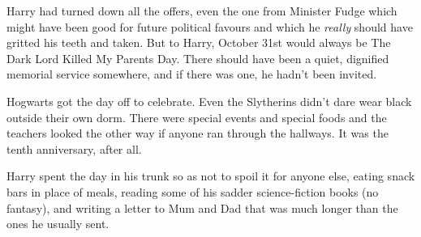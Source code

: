 Harry had turned down all the offers, even the one from Minister Fudge which might have been good for future political favours and which he \emph{really} should have gritted his teeth and taken. But to Harry, October 31st would always be The Dark Lord Killed My Parents Day. There should have been a quiet, dignified memorial service somewhere, and if there was one, he hadn’t been invited.

Hogwarts got the day off to celebrate. Even the Slytherins didn’t dare wear black outside their own dorm. There were special events and special foods and the teachers looked the other way if anyone ran through the hallways. It was the tenth anniversary, after all.

Harry spent the day in his trunk so as not to spoil it for anyone else, eating snack bars in place of meals, reading some of his sadder science-fiction books (no fantasy), and writing a letter to Mum and Dad that was much longer than the ones he usually sent.


